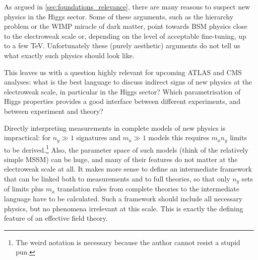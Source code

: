 

As argued in \autoref{sec:foundations_relevance}, there are many
reasons to suspect new physics in the Higgs sector. Some of these
arguments, such as the hierarchy problem or the WIMP miracle of dark
matter, point towards BSM physics close to the electroweak scale or,
depending on the level of acceptable fine-tuning, up to a few
TeV. Unfortunately these (purely aesthetic) arguments do not tell us
what exactly such physics should look like.

This leaves us with a question highly relevant for upcoming ATLAS and
CMS analyses: what is the best language to discuss indirect signs of
new physics at the electroweak scale, in particular in the Higgs
sector? Which parametrisation of Higgs properties provides a good
interface between different experiments, and between experiment and
theory?

Directly interpreting measurements in complete models of new physics
is impractical: for $n_y \gg 1$ signatures and $m_a \gg 1$ models this
requires $m_a n_y$ limits to be derived.\footnote{The weird notation
  is necessary because the author cannot resist a stupid pun.} Also,
the parameter space of such models (think of the relatively simple
MSSM) can be huge, and many of their features do not matter at the
electroweak scale at all. It makes more sense to define an
intermediate framework that can be linked both to measurements and to
full theories, so that only $n_y$ sets of limits plus $m_a$ translation
rules from complete theories to the intermediate language have to be
calculated. Such a framework should include all necessary physics, but
no phenomena irrelevant at this scale. This is exactly the defining
feature of an effective field theory.




